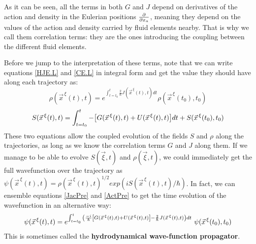 \documentclass[11pt, a4paper]{article} %
\begin{document}
As it can be seen, all the terms in both $G$ and $J$ depend on derivatives of the action and density in the Eulerian positions $\pdv{}{x_a}$, meaning they depend on the values of the action and density carried by fluid elements nearby. That is why we call them correlation terms: they are the ones introducing the coupling between the different fluid elements.

Before we jump to the interpretation of these terms, note that we can write equations \eqref{HJE.L} and \eqref{CE.L} in integral form and get the value they should have along each trajectory as:
\begin{equation}\label{JacPre}
\rho(\vec{x}^{\, \xi}(t),t)=e^{\int_{t=t_0}^t \frac{2}{\hbar}J(\vec{x}^{\, \xi}(t),t) dt}\rho(\vec{x}^{\, \xi}(t_0),t_0)
\end{equation}
\begin{equation}\label{ActPre}
S(\vec{x}^{\, \xi}(t),t)=\int_{t=t_0}^t -\qty[G(\vec{x}^{\, \xi}(t),t)+U(\vec{x}^{\, \xi}(t),t)] dt+S(\vec{x}^{\, \xi}(t_0),t_0)
\end{equation}
These two equations allow the coupled evolution of the fields $S$ and $\rho$ along the trajectories, as long as we know the correlation terms $G$ and $J$ along them. If we manage to be able to evolve $S(\vec{\xi},t)$ and $\rho(\vec{\xi},t)$, we could immediately get the full wavefunction over the trajectory as $\psi(\vec{x}^{\, \xi}(t),t)=\rho(\vec{x}^{\, \xi}(t),t)^{1/2}exp(iS(\vec{x}^{\, \xi}(t),t)/\hbar)$. In fact, we can ensemble equations \eqref{JacPre} and \eqref{ActPre} to get the time evolution of the wavefunction in an alternative way:
\begin{equation}
\psi(\vec{x}^{\, \xi}(t),t)=e^{\int_{t=t_0}^t\qty( \frac{-i}{\hbar} \qty[G(\vec{x}^{\, \xi}(t),t)+U(\vec{x}^{\, \xi}(t),t)]- \frac{2}{\hbar}J(\vec{x}^{\, \xi}(t),t) )dt}\ \psi(\vec{x}^{\, \xi}(t_0),t_0)
\end{equation}
This is sometimes called the {\bf hydrodynamical wave-function propagator}.
\end{document}

